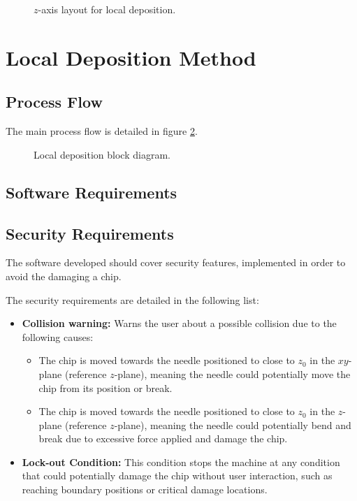 
\begin{figure}[!ht]
\centering
  
  \caption{$z$-axis layout for local deposition.}
  \label{fig:zaxislo}
\end{figure}

\section{Local Deposition Method}

\subsection{Process Flow}

The main process flow is detailed in figure \ref{fig:ldbd}. 

\begin{figure}[!ht]
\centering
  
  \caption{Local deposition block diagram.}
  \label{fig:ldbd}
\end{figure}

\subsection{Software Requirements}

\clearpage
\newpage

\clearpage
\newpage

\subsection{Security Requirements}

The software developed should cover security features, implemented in order to avoid the damaging a chip. 

The security requirements are detailed in the following list:

\begin{itemize}
\item \textbf{Collision warning:} Warns the user about a possible collision due to the following causes:
	\begin{itemize}
	\item The chip is moved towards the needle positioned to close to $z_0$ in the $xy$-plane (reference $z$-plane), meaning the needle could potentially move the chip from its position or break.
	\item The chip is moved towards the needle positioned to close to $z_0$ in the $z$-plane (reference $z$-plane), meaning the needle could potentially bend and break due to excessive force applied and damage the chip.
	\end{itemize}
\item \textbf{Lock-out Condition:} This condition stops the machine at any condition that could potentially damage the chip without user interaction, such as reaching boundary positions or critical damage locations.
\end{itemize}

